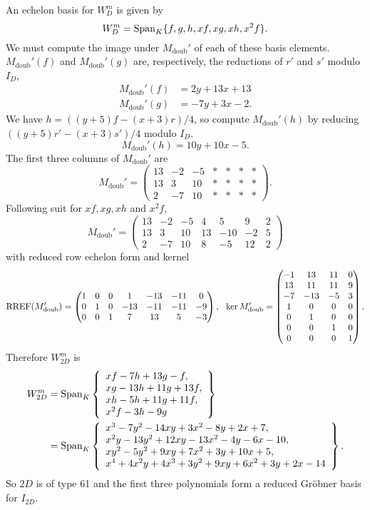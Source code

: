 An echelon basis for $W_D^m$ is given by
\[ W_D^m = \operatorname{Span}_K\{ f, g, h, xf, xg, xh, x^2f\}. \]
We must compute the image under $M_{\text{doub}}'$ of each of these basis elements.
$M_{\text{doub}}'(f)$ and $M_{\text{doub}}'(g)$ are, respectively, the reductions of $r'$ and $s'$ modulo $I_D$,
\begin{align*}
  M_{\text{doub}}'(f) &= 2y + 13x + 13 \\
  M_{\text{doub}}'(g) &= -7y + 3x - 2.
\end{align*}
We have $h = ((y + 5)f - (x + 3)r)/4$,
so compute $M_{\text{doub}}'(h)$ by reducing $((y + 5)r' - (x + 3)s')/4$ modulo $I_D$.
\[ M_{\text{doub}}'(h) = 10y + 10x - 5. \]
The first three columns of $M_{\text{doub}}'$ are
\[ M_{\text{doub}}' = \begin{pmatrix}
   13 & -2 & -5 & * & * & * & * \\
   13 &  3 & 10 & * & * & * & * \\
    2 & -7 & 10 & * & * & * & *
\end{pmatrix}. \]
Following suit for $xf, xg, xh$ and $x^2f$,
\[ M_{\text{doub}}' = \begin{pmatrix}
   13 & -2 & -5 &  4 &   5 &  9 & 2 \\
   13 &  3 & 10 & 13 & -10 & -2 & 5 \\
    2 & -7 & 10 &  8 &  -5 & 12 & 2
\end{pmatrix} \]
with reduced row echelon form and kernel
\[ \operatorname{RREF}(M_{\text{doub}}') = \begin{pmatrix}
  1 & 0 & 0 &   1 & -13 & -11 &  0 \\
  0 & 1 & 0 & -13 & -11 & -11 & -9 \\
  0 & 0 & 1 &   7 &  13 &   5 & -3
\end{pmatrix}, ~~
\ker M_{\text{doub}}' = \begin{pmatrix}
   -1 &  13 & 11 & 0 \\
   13 &  11 & 11 & 9 \\
   -7 & -13 & -5 & 3 \\
    1 &   0 &  0 & 0 \\
    0 &   1 &  0 & 0 \\
    0 &   0 &  1 & 0 \\
    0 &   0 &  0 & 1
\end{pmatrix}. \]
Therefore $W_{2D}^m$ is
\begin{align*}
  W_{2D}^m &= \operatorname{Span}_K
\left\{ \begin{array}{l}
    xf   -  7h + 13g -   f, \\
    xg   - 13h + 11g + 13f, \\
    xh   -  5h + 11g + 11f, \\
    x^2f -  3h -  9g
\end{array} \right\} \\
&= \operatorname{Span}_K
\left\{ \begin{array}{l}
     x^3 -  7y^2 - 14xy +  3x^2 - 8y +  2x +  7, \\
    x^2y - 13y^2 + 12xy - 13x^2 - 4y -  6x - 10, \\
    xy^2 -  5y^2 +  9xy +  7x^2 + 3y + 10x +  5, \\
     x^4 + 4x^2y + 4x^3 + 3y^2 + 9xy + 6x^2 + 3y + 2x - 14
\end{array} \right\}.
\end{align*}
So $2D$ is of type 61 and the first three polynomials form a reduced Gr\"obner basis for $I_{2D}$.
